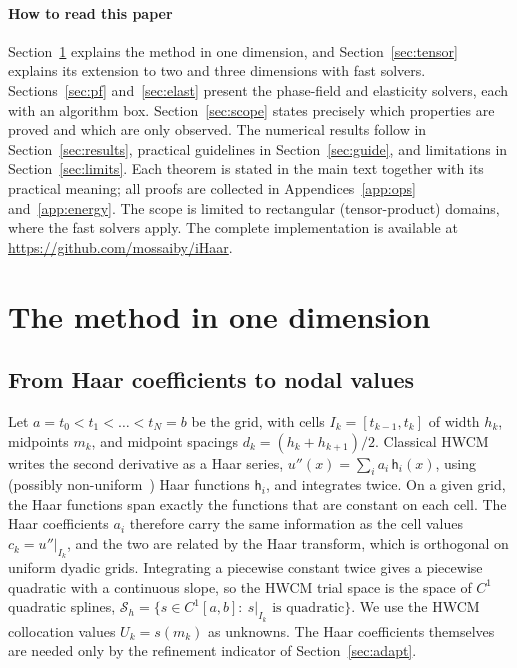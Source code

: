 \documentclass[preprint,12pt]{elsarticle}
\theoremstyle{remark}
\newcommand{\repo}{\url{https://github.com/mossaiby/iHaar}}
\begin{document}
\paragraph{How to read this paper}
Section~\ref{sec:method} explains the method in one dimension, and Section~\ref{sec:tensor} explains
its extension to two and three dimensions with fast solvers. Sections~\ref{sec:pf} and~\ref{sec:elast}
present the phase-field and elasticity solvers, each with an algorithm box. Section~\ref{sec:scope}
states precisely which properties are proved and which are only observed. The numerical results follow
in Section~\ref{sec:results}, practical guidelines in Section~\ref{sec:guide}, and limitations in
Section~\ref{sec:limits}. Each theorem is stated in the main text together with its practical meaning;
all proofs are collected in Appendices~\ref{app:ops} and~\ref{app:energy}. The scope is limited to
rectangular (tensor-product) domains, where the fast solvers apply. The complete implementation is
available at \repo.

\section{The method in one dimension}\label{sec:method}
\subsection{From Haar coefficients to nodal values}
Let $a=t_0<t_1<\dots<t_N=b$ be the grid, with cells $I_k=[t_{k-1},t_k]$ of width $h_k$, midpoints
$m_k$, and midpoint spacings $d_k=(h_k+h_{k+1})/2$. Classical HWCM writes the second derivative as a
Haar series, $u''(x)=\sum_ia_i\,\mathsf h_i(x)$, using (possibly non-uniform~\cite{dubeau2004nonuniform})
Haar functions $\mathsf h_i$, and integrates twice. On a given grid, the Haar functions span exactly
the functions that are constant on each cell. The Haar coefficients $a_i$ therefore carry the same
information as the cell values $c_k=u''|_{I_k}$, and the two are related by the Haar transform, which is
orthogonal on uniform dyadic grids. Integrating a piecewise constant twice gives a piecewise quadratic
with a continuous slope, so the HWCM trial space is the space of $C^1$ quadratic splines,
$\mathcal S_h=\{s\in C^1[a,b]:\ s|_{I_k}\text{ is quadratic}\}$. We use the HWCM collocation values
$U_k=s(m_k)$ as unknowns. The Haar coefficients themselves are needed only by the refinement indicator
of Section~\ref{sec:adapt}.
\end{document}
